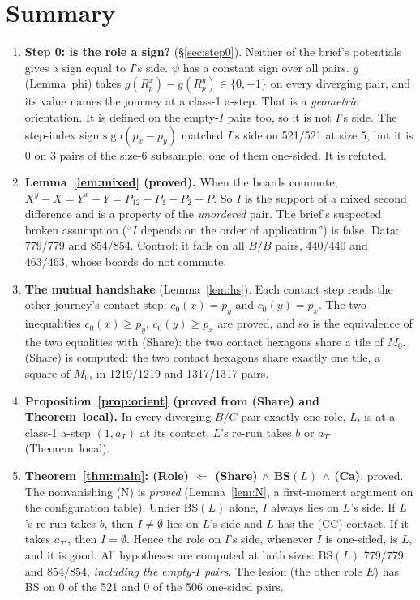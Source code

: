 \documentclass[11pt]{article}
\theoremstyle{definition}\newtheorem{definition}[theorem]{Definition}\newtheorem{remark}[theorem]{Remark}
\begin{document}
\section*{Summary}
\begin{enumerate}
\item \textbf{Step 0: is the role a sign?} (\S\ref{sec:step0}). Neither of the brief's potentials gives a sign equal to $I$'s side. $\psi$ has a constant sign over all pairs. $g$ (Lemma~phi) takes $g(R^x_{p})-g(R^y_{p})\in\{0,-1\}$ on every diverging pair, and its value names the journey at a class-1 a-step. That is a \emph{geometric} orientation. It is defined on the empty-$I$ pairs too, so it is not $I$'s side. The step-index sign $\mathrm{sign}(p_x-p_y)$ matched $I$'s side on 521/521 at size 5, but it is $0$ on 3 pairs of the size-6 subsample, one of them one-sided. It is refuted.
\item \textbf{Lemma~\ref{lem:mixed} (proved).} When the boards commute, $X^y-X=Y^x-Y=P_{12}-P_1-P_2+P$. So $I$ is the support of a mixed second difference and is a property of the \emph{unordered} pair. The brief's suspected broken assumption (``$I$ depends on the order of application'') is false. Data: 779/779 and 854/854. Control: it fails on all $B/B$ pairs, 440/440 and 463/463, whose boards do not commute.
\item \textbf{The mutual handshake} (Lemma~\ref{lem:hs}). Each contact step reads the other journey's contact step: $c_0(x)=p_y$ and $c_0(y)=p_x$. The two inequalities $c_0(x)\ge p_y$, $c_0(y)\ge p_x$ are proved, and so is the equivalence of the two equalities with (Share): the two contact hexagons share a tile of $M_0$. (Share) is computed: the two contact hexagons share exactly one tile, a square of $M_0$, in 1219/1219 and 1317/1317 pairs.
\item \textbf{Proposition~\ref{prop:orient} (proved from (Share) and Theorem~local).} In every diverging $B/C$ pair exactly one role, $L$, is at a class-1 a-step $(1,a_T)$ at its contact. $L$'s re-run takes $b$ or $a_{T'}$ (Theorem~local).
\item \textbf{Theorem~\ref{thm:main}: (Role) $\Leftarrow$ (Share) $\wedge$ BS$(L)$ $\wedge$ (Ca)}, proved. The nonvanishing (N) is \emph{proved} (Lemma~\ref{lem:N}, a first-moment argument on the configuration table). Under BS$(L)$ alone, $I$ always lies on $L$'s side. If $L$'s re-run takes $b$, then $I\neq\emptyset$ lies on $L$'s side and $L$ has the (CC) contact. If it takes $a_{T'}$, then $I=\emptyset$. Hence the role on $I$'s side, whenever $I$ is one-sided, is $L$, and it is good. All hypotheses are computed at both sizes: BS$(L)$ 779/779 and 854/854, \emph{including the empty-$I$ pairs}. The lesion (the other role $E$) has BS on 0 of the 521 and 0 of the 506 one-sided pairs.

\end{enumerate}
\end{document}
